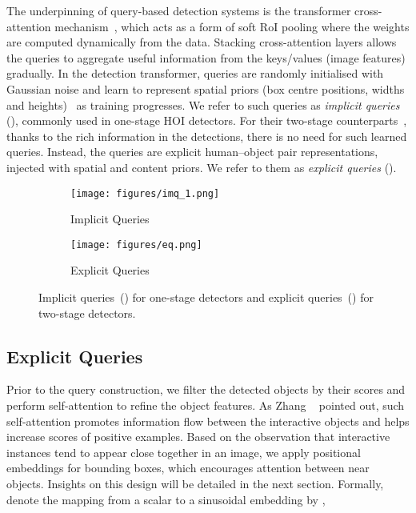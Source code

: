 \documentclass[10pt,twocolumn,letterpaper]{article}
\begin{document}
The underpinning of query-based detection systems is the transformer cross-attention mechanism~\cite{xfmer}, which acts as a form of soft RoI pooling where the weights are computed dynamically from the data. Stacking cross-attention layers allows the queries to aggregate useful information from the keys/values (image features) gradually. In the detection transformer, queries are randomly initialised with Gaussian noise and learn to represent spatial priors (box centre positions, widths and heights)~\cite{detr} as training progresses. We refer to such queries as \textit{implicit queries} (), commonly used in one-stage HOI detectors. For their two-stage counterparts~\cite{upt, stip}, thanks to the rich information in the detections, there is no need for such learned queries. Instead, the queries are explicit human--object pair representations, injected with spatial and content priors. We refer to them as \textit{explicit queries} ().

\begin{figure}[t]\captionsetup[subfigure]{font=footnotesize}
   \begin{subfigure}[t]{0.48\linewidth}
     \centering
     \texttt{[image: figures/imq\_1.png]}
     \caption{Implicit Queries}
     \label{fig:imp_q}
   \end{subfigure}
   \begin{subfigure}[t]{0.48\linewidth}
   \centering
     \texttt{[image: figures/eq.png]}
     \caption{Explicit Queries}
     \label{fig:exp_q}
   \end{subfigure}
   \vspace{5px}
   \caption{Implicit queries~() for one-stage detectors and explicit queries~() for two-stage detectors.}
   \label{fig:decoder}
\end{figure}

\subsection{Explicit Queries}

Prior to the query construction, we filter the detected objects by their scores and perform self-attention to refine the object features. As Zhang \etal~\cite{upt} pointed out, such self-attention promotes information flow between the interactive objects and helps increase scores of positive examples. Based on the observation that interactive instances tend to appear close together in an image, we apply positional embeddings for bounding boxes, which encourages attention between near objects. Insights on this design will be detailed in the next section. 
Formally, denote the mapping from a scalar to a sinusoidal embedding by ,
\end{document}
